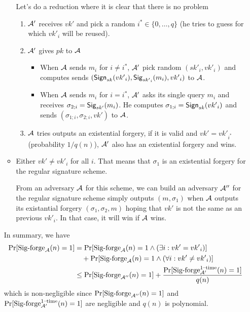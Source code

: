 \begin{solution}
\begin{enumerate}
\begin{itemize}
          Let's do a reduction where it is clear that there is no problem
          \begin{enumerate}
            \item $\mathcal{A}'$ receives $vk'$ and pick a random $i^* \in \{0, \ldots, q\}$ (he tries to guess for which ${vk'}_i$ will be reused).
            \item $\mathcal{A}'$ gives $pk$ to $\mathcal{A}$
              \begin{itemize}
                \item When $\mathcal{A}$ sends $m_i$ for $i \neq i^*$, $\mathcal{A}'$ pick random $({sk'}_i, {vk'}_i)$ and
                  computes sends $(\operatorname{\mathsf{Sign}}_{sk}({vk'}_i), \operatorname{\mathsf{Sig}}_{{sk'}_i}(m_i), {vk'}_i)$ to $\mathcal{A}$.
                \item When $\mathcal{A}$ sends $m_i$ for $i = i^*$, $\mathcal{A}'$ asks its single query $m_i$ and receives $\sigma_{2;i} = \operatorname{\mathsf{Sig}}_{sk'}(m_i)$.
                  He computes $\sigma_{1;i} = \operatorname{\mathsf{Sign}}_{sk}({vk'}_i)$ and sends $(\sigma_{1;i}, \sigma_{2;i}, vk')$ to $\mathcal{A}$.
              \end{itemize}
            \item $\mathcal{A}$ tries outputs an existential forgery, if it is valid and $vk' = {vk'}_{i^*}$ (probability $1/q(n)$),
              $\mathcal{A}'$ also has an existential forgery and wins.
          \end{enumerate}
        \item
          Either $vk' \neq {vk'}_i$ for all $i$.
          That means that $\sigma_1$ is an existential forgery for the regular signature scheme.

          From an adversary $\mathcal{A}$ for this scheme, we
          can build an adversary $\mathcal{A}''$ for the regular signature scheme
          simply outputs $(m,\sigma_1)$ when $\mathcal{A}$ outputs its
          existantial forgery $(\sigma_1, \sigma_2, m)$
          hoping that $vk'$ is not the same as an previous ${vk'}_i$.
          In that case, it will win if $\mathcal{A}$ wins.
      \end{itemize}

      In summary, we have
      \begin{align*}
        \Pr[\operatorname{Sig-forge}_{\mathcal{A}}(n) = 1]
        & = \Pr[\operatorname{Sig-forge}_{\mathcal{A}}(n) = 1 \land (\exists i: vk' = {vk'}_i)]\\
        & \quad + \Pr[\operatorname{Sig-forge}_{\mathcal{A}}(n) = 1 \land (\forall i: vk' \neq {vk'}_i)]\\
        & \leq \Pr[\operatorname{Sig-forge}_{\mathcal{A}''}(n) = 1] + \frac{\Pr[\operatorname{Sig-forge}^{\text{1--time}}_{\mathcal{A}'}(n) = 1]}{q(n)}
      \end{align*}
      which is non-negligible since $\Pr[\operatorname{Sig-forge}_{\mathcal{A}''}(n) = 1]$ and $\Pr[\operatorname{Sig-forge}^{\text{1--time}}_{\mathcal{A}'}(n) = 1]$ are negligible and $q(n)$ is polynomial.
  \end{enumerate}
\end{solution}

